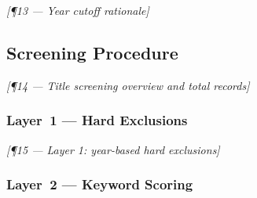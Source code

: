 \bigskip\noindent\textit{[¶13 — Year cutoff rationale]}


\subsection{Screening Procedure}
\label{sec:methodology:screening}



\bigskip\noindent\textit{[¶14 — Title screening overview and total records]}

\subsubsection{Layer~1 — Hard Exclusions}


\bigskip\noindent\textit{[¶15 — Layer 1: year-based hard exclusions]}

\subsubsection{Layer~2 — Keyword Scoring}

